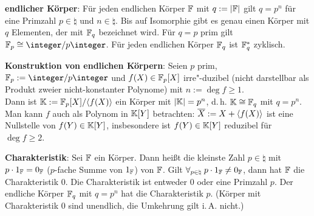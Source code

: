 \textbf{endlicher Körper}:
Für jeden endlichen Körper $\mathbb{F}$ mit $q := |\mathbb{F}|$ gilt $q = p^n$ für eine Primzahl
$p \in \natural$ und $n \in \natural$.
Bis auf Isomorphie gibt es genau einen Körper mit $q$ Elementen,
der mit $\mathbb{F}_q$ bezeichnet wird.
Für $q = p$ prim gilt $\FF_p \cong \ZpZ$.
Für jeden endlichen Körper $\mathbb{F}_q$ ist $\mathbb{F}_q^\ast$ zyklisch.

\textbf{Konstruktion von endlichen Körpern}:
Seien $p$ prim, $\FF_p := \ZpZ$ und $f(X) \in \mathbb{F}_p[X]$ irre"-duzibel
(nicht darstellbar als Produkt zweier nicht-konstanter Polynome) mit $n := \deg f \ge 1$.\\
Dann ist $\mathbb{K} := \mathbb{F}_p[X]/\langle f(X)\rangle$ ein Körper mit $|\mathbb{K}| = p^n$, d.\,h. $\mathbb{K} \cong \mathbb{F}_q$
mit $q = p^n$.
Man kann $f$ auch als Polynom in $\mathbb{K}[Y]$ betrachten:
$\overline{X} := X + \langle f(X)\rangle$ ist eine Nullstelle von $f(Y) \in \mathbb{K}[Y]$,
insbesondere ist $f(Y) \in \mathbb{K}[Y]$ reduzibel für $\deg f \ge 2$.

\textbf{Charakteristik}:
Sei $\mathbb{F}$ ein Körper.
Dann heißt die kleinste Zahl $p \in \natural$ mit $p \cdot 1_{\mathbb{F}} = 0_{\mathbb{F}}$
($p$-fache Summe von $1_{\mathbb{F}}$)  von $\mathbb{F}$.
Gilt $\forall_{p \in \natural}\; p \cdot 1_{\mathbb{F}} \not= 0_{\mathbb{F}}$, dann hat $\mathbb{F}$
die Charakteristik $0$.
Die Charakteristik ist entweder $0$ oder eine Primzahl $p$.
Der endliche Körper $\mathbb{F}_q$ mit $q = p^n$ hat die Charakteristik $p$.
(Körper mit Charakteristik $0$ sind unendlich, die Umkehrung gilt i.\,A. nicht.)

\pagebreak
